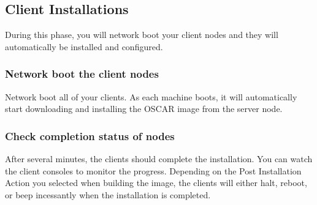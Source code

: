 
\subsection{Client Installations}
\label{det:client-install}

During this phase, you will network boot your client nodes and they
will automatically be installed and configured.  


\subsubsection{Network boot the client nodes}


Network boot all of your clients.  As each machine boots, it will
automatically start downloading and installing the OSCAR image from
the server node.


\subsubsection{Check completion status of nodes}
\label{det:client-finish}

After several minutes, the clients should complete the installation.
You can watch the client consoles to monitor the progress. Depending
on the Post Installation Action you selected when building the image,
the clients will either halt, reboot, or beep incessantly when the
installation is completed.



